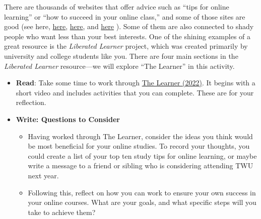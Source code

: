 \documentclass[
  letterpaper,
  DIV=11,
  numbers=noendperiod]{scrreprt}
\providecommand{\tightlist}{%
  \setlength{\itemsep}{0pt}\setlength{\parskip}{0pt}}\usepackage{longtable,booktabs,array}
\begin{document}
\begin{tcolorbox}[enhanced jigsaw, toprule=.15mm, colback=white, colframe=quarto-callout-note-color-frame, bottomtitle=1mm, leftrule=.75mm, coltitle=black, titlerule=0mm, rightrule=.15mm, colbacktitle=quarto-callout-note-color!10!white, left=2mm, title={Learning Activity}, opacitybacktitle=0.6, opacityback=0, breakable, toptitle=1mm, arc=.35mm, bottomrule=.15mm]

There are thousands of websites that offer advice such as ``tips for
online learning'' or ``how to succeed in your online class,'' and some
of those sites are good (see here,
\href{https://www.ualberta.ca/current-students/academic-success-centre/resources/working-online.html}{here},
\href{https://online.umn.edu/story/15-tips-succeed-online-class}{here},
and
\href{https://www.trentu.ca/online/student-support/be-a-successful-online-learner}{here}
). Some of them are also connected to shady people who want less than
your best interests. One of the shining examples of a great resource is
the \emph{Liberated Learner} project, which was created primarily by
university and college students like you. There are four main sections
in the \emph{Liberated Learner} resource---we will explore ``The
Learner'' in this activity.

\begin{itemize}
\tightlist
\item
  \textbf{Read}: Take some time to work through
  \href{https://ecampusontario.pressbooks.pub/learner/part/learner/}{The
  Learner (2022)}. It begins with a short video and includes activities
  that you can complete. These are for your reflection.
\item
  \textbf{Write: Questions to Consider}

  \begin{itemize}
  \tightlist
  \item
    Having worked through The Learner, consider the ideas you think
    would be most beneficial for your online studies. To record your
    thoughts, you could create a list of your top ten study tips for
    online learning, or maybe write a message to a friend or sibling who
    is considering attending TWU next year.
  \item
    Following this, reflect on how you can work to ensure your own
    success in your online courses. What are your goals, and what
    specific steps will you take to achieve them?
  \end{itemize}
\end{itemize}

\end{tcolorbox}
\end{document}
